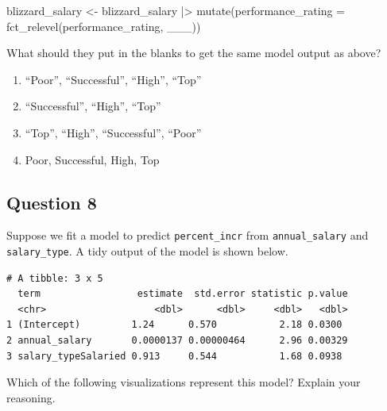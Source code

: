 \documentclass[
  letterpaper,
  DIV=11,
  numbers=noendperiod]{scrartcl}
\newenvironment{Shaded}{\begin{snugshade}}{\end{snugshade}}
\newcommand{\AttributeTok}[1]{\textcolor[rgb]{0.40,0.45,0.13}{#1}}
\newcommand{\FunctionTok}[1]{\textcolor[rgb]{0.28,0.35,0.67}{#1}}
\newcommand{\NormalTok}[1]{\textcolor[rgb]{0.00,0.23,0.31}{#1}}
\newcommand{\OtherTok}[1]{\textcolor[rgb]{0.00,0.23,0.31}{#1}}
\newcommand{\SpecialCharTok}[1]{\textcolor[rgb]{0.37,0.37,0.37}{#1}}
\providecommand{\tightlist}{%
  \setlength{\itemsep}{0pt}\setlength{\parskip}{0pt}}\usepackage{longtable,booktabs,array}
\begin{document}
\begin{Shaded}
\begin{Highlighting}[]
\NormalTok{blizzard\_salary }\OtherTok{\textless{}{-}}\NormalTok{ blizzard\_salary }\SpecialCharTok{|\textgreater{}}
  \FunctionTok{mutate}\NormalTok{(}\AttributeTok{performance\_rating =} \FunctionTok{fct\_relevel}\NormalTok{(performance\_rating, \_\_\_))}
\end{Highlighting}
\end{Shaded}

What should they put in the blanks to get the same model output as
above?

\begin{enumerate}
\def\labelenumi{\alph{enumi}.}
\tightlist
\item
  ``Poor'', ``Successful'', ``High'', ``Top''
\item
  ``Successful'', ``High'', ``Top''
\item
  ``Top'', ``High'', ``Successful'', ``Poor''
\item
  Poor, Successful, High, Top
\end{enumerate}

\subsection{Question 8}\label{question-8}

Suppose we fit a model to predict \texttt{percent\_incr} from
\texttt{annual\_salary} and \texttt{salary\_type}. A tidy output of the
model is shown below.

\begin{verbatim}
# A tibble: 3 x 5
  term                 estimate  std.error statistic p.value
  <chr>                   <dbl>      <dbl>     <dbl>   <dbl>
1 (Intercept)         1.24      0.570           2.18 0.0300 
2 annual_salary       0.0000137 0.00000464      2.96 0.00329
3 salary_typeSalaried 0.913     0.544           1.68 0.0938 
\end{verbatim}

Which of the following visualizations represent this model? Explain your
reasoning.
\end{document}
